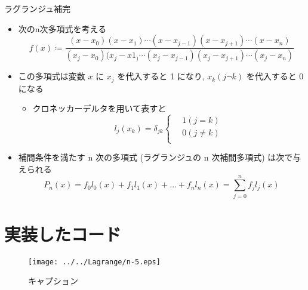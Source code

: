 \documentclass[titlepage, a4paper, 11pt, dvipdfmx]{jsarticle}
\begin{document}
\begin{itembox}[l]{ラグランジュ補完}
    \begin{itemize}
        \item 次のn次多項式を考える\\
      $$ f(x) \coloneqq \frac{(x − x_0)(x − x_1)\cdots(x − x_{j−1})(x − x_{j+1})\cdots(x − x_n)}{(x_j − x_0)(x_j − x1_)\cdots(x_j − x_{j−1})(x_j − x_{j+1})\cdots(x_j − x_n)} $$
        \item この多項式は変数 $x$ に $x_j$ を代入すると 1 になり, $x_k(j \neg k)$ を代入すると 0 になる
        \begin{itemize}
            \item クロネッカーデルタを用いて表すと
          \begin{equation*}
             l_j(x_k) = δ_{jk} \left\{ \,
                \begin{aligned}
                    & 1　(j = k) \\
                    & 0　(j \neq k)\\
                \end{aligned}
            \right.
            \end{equation*}
        \end{itemize} 
        \item 補間条件を満たす n 次の多項式 (ラグランジュの n 次補間多項式) は次で与えられる
        \begin{equation*}
            P_n(x) = f_0l_0(x) + f_1l_1(x) + \dots + f_nl_n(x) = \sum_{j=0}^n f_jl_j(x)
        \end{equation*}
  \end{itemize}
\end{itembox}
\section{実装したコード}


\begin{figure}[H]
  \begin{center}%
    \texttt{[image: ../../Lagrange/n-5.eps]}%
  \caption{キャプション}
  \label{Label}%
  \end{center}
\end{figure}
\end{document}
